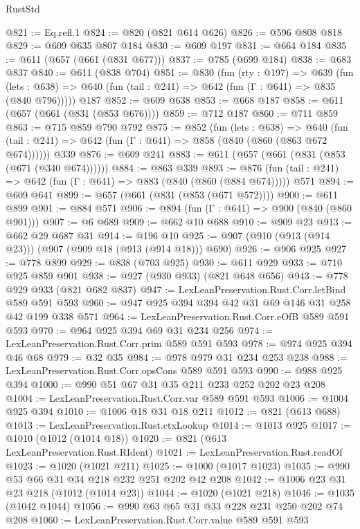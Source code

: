 \begin{lexlean}{RustStd}
\begin{coremodule}
@821 := Eq.refl.{1}
@824 := @820 (@821 @614 @626)
@826 := @596 @808 @818
@829 := @609 @635 @807 @184
@830 := @609 @197
@831 := @664 @184
@835 := @611 (@657 (@661 (@831 @677)))
@837 := @785 (@699 @184)
@838 := @683 @837
@840 := @611 (@838 @704)
@851 := @830
    (fun (rty : @197) =>
    @639
      (fun (lets : @638) => @640 (fun (tail : @241) => @642 (fun (Γ : @641) => @835 (@840 @796)))))
    @187
@852 := @609 @638
@853 := @668 @187
@858 := @611 (@657 (@661 (@831 (@853 @676))))
@859 := @712 @187
@860 := @711 @859
@863 := @715 @859 @790 @792
@875 := @852
    (fun (lets : @638) =>
    @640 (fun (tail : @241) => @642 (fun (Γ : @641) => @858 (@840 (@860 (@863 @672 @674))))))
    @339
@876 := @609 @241
@883 := @611 (@657 (@661 (@831 (@853 (@671 (@340 @674))))))
@884 := @863 @339
@893 := @876 (fun (tail : @241) => @642 (fun (Γ : @641) => @883 (@840 (@860 (@884 @674))))) @571
@894 := @609 @641
@899 := @657 (@661 (@831 (@853 (@671 @572))))
@900 := @611 @899
@901 := @884 @571
@906 := @894 (fun (Γ : @641) => @900 (@840 (@860 @901)))
@907 := @6 @689
@909 := @662 @10 @688
@910 := @909 @23
@913 := @662 @29 @687 @31
@914 := @196 @10
@925 := @907 (@910 (@913 (@914 @23))) (@907 (@909 @18 (@913 (@914 @18))) @690)
@926 := @906 @925
@927 := @778 @899
@929 := @838 (@703 @925)
@930 := @611 @929
@933 := @710 @925 @859 @901
@938 := @927 (@930 @933) (@821 @648 @656)
@943 := @778 @929 @933 (@821 @682 @837)
@947 := LexLeanPreservation.Rust.Corr.letBind @589 @591 @593
@960 := @947 @925 @394 @394 @42 @31 @69 @146 @31 @258 @42 @199 @338 @571
@964 := LexLeanPreservation.Rust.Corr.eOfB @589 @591 @593
@970 := @964 @925 @394 @69 @31 @234 @256
@974 := LexLeanPreservation.Rust.Corr.prim @589 @591 @593
@978 := @974 @925 @394 @46 @68
@979 := @32 @35
@984 := @978 @979 @31 @234 @253 @238
@988 := LexLeanPreservation.Rust.Corr.opsCons @589 @591 @593
@990 := @988 @925 @394
@1000 := @990 @51 @67 @31 @35 @211 @233 @252 @202 @23 @208
@1004 := LexLeanPreservation.Rust.Corr.var @589 @591 @593
@1006 := @1004 @925 @394
@1010 := @1006 @18 @31 @18 @211
@1012 := @821 (@613 @688)
@1013 := LexLeanPreservation.Rust.ctxLookup
@1014 := @1013 @925
@1017 := @1010 (@1012 (@1014 @18))
@1020 := @821 (@613 LexLeanPreservation.Rust.RIdent)
@1021 := LexLeanPreservation.Rust.readOf
@1023 := @1020 (@1021 @211)
@1025 := @1000 (@1017 @1023)
@1035 := @990 @53 @66 @31 @34 @218 @232 @251 @202 @42 @208
@1042 := @1006 @23 @31 @23 @218 (@1012 (@1014 @23))
@1044 := @1020 (@1021 @218)
@1046 := @1035 (@1042 @1044)
@1056 := @990 @63 @65 @31 @33 @228 @231 @250 @202 @74 @208
@1060 := LexLeanPreservation.Rust.Corr.value @589 @591 @593

\end{coremodule}
\end{lexlean}

